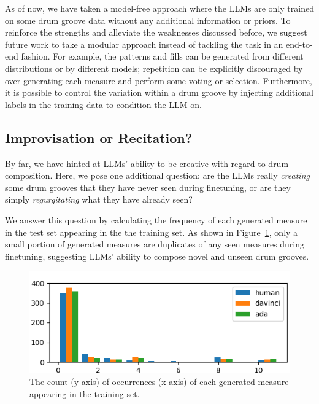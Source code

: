 \documentclass[letterpaper]{article} %
\begin{document}
As of now, we have taken a model-free approach where the LLMs are only trained on some drum groove data without any additional information or priors. To reinforce the strengths and alleviate the weaknesses discussed before, we suggest future work to take a modular approach instead of tackling the task in an end-to-end fashion. For example, the patterns and fills can be generated from different distributions or by different models; repetition can be explicitly discouraged by over-generating each measure and perform some voting or selection. Furthermore, it is possible to control the variation within a drum groove by injecting additional labels in the training data to condition the LLM on.

\subsection{Improvisation or Recitation?}
By far, we have hinted at LLMs' ability to be creative with regard to drum composition. Here, we pose one additional question: are the LLMs really \textit{creating} some drum grooves that they have never seen during finetuning, or are they simply \textit{regurgitating} what they have already seen?

We answer this question by calculating the frequency of each generated measure in the test set appearing in the the training set. As shown in Figure~\ref{fig:duplication}, only a small portion of generated measures are duplicates of any seen measures during finetuning, suggesting LLMs' ability to compose novel and unseen drum grooves.

\begin{figure}
\centering
\includegraphics[scale=0.43200000000000005]{images/duplication.png}
\caption{The count (y-axis) of occurrences (x-axis) of each generated measure appearing in the training set.}
\label{fig:duplication}
\end{figure}

\vspace{-1.62mm}
\vspace{-3.15mm}
\end{document}

